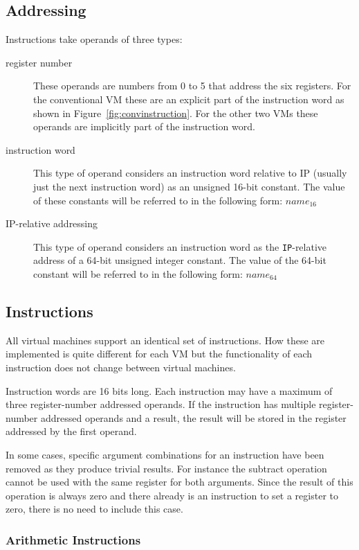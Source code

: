 \documentclass[english,a4paper]{article}
\begin{document}
\subsection{Addressing}

Instructions take operands of three types:
\begin{description}
\item[register number] These operands are numbers from 0 to 5 that
  address the six registers. For the conventional VM these are an
  explicit part of the instruction word as shown in
  Figure~\ref{fig:convinstruction}. For the other two VMs these
  operands are implicitly part of the instruction word.
\item[instruction word] This type of operand considers an instruction
  word relative to IP (usually just the next instruction word) as an
  unsigned 16-bit constant. The value of these constants will be
  referred to in the following form: $name_{16}$
\item[IP-relative addressing] This type of operand considers an
  instruction word as the \verb|IP|-relative address of a 64-bit
  unsigned integer constant. The value of the 64-bit constant will be
  referred to in the following form: $name_{64}$
\end{description}

\subsection{Instructions}

All virtual machines support an identical set of instructions. How
these are implemented is quite different for each VM but the
functionality of each instruction does not change between virtual
machines.

Instruction words are 16 bits long. Each instruction may have a
maximum of three register-number addressed operands. If the
instruction has multiple register-number addressed operands and a
result, the result will be stored in the register addressed by the
first operand.

In some cases, specific argument combinations for an instruction have
been removed as they produce trivial results. For instance the
subtract operation cannot be used with the same register for both
arguments. Since the result of this operation is always zero and there
already is an instruction to set a register to zero, there is no need
to include this case.

\subsubsection{Arithmetic Instructions}
\end{document}
